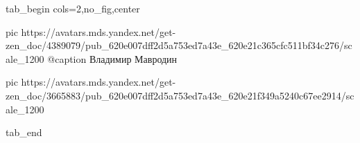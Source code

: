  
 
 
 
 


\ifcmt
  tab_begin cols=2,no_fig,center

     pic https://avatars.mds.yandex.net/get-zen_doc/4389079/pub_620e007dff2d5a753ed7a43e_620e21c365cfc511bf34c276/scale_1200
		 @caption Владимир Мавродин

		 pic https://avatars.mds.yandex.net/get-zen_doc/3665883/pub_620e007dff2d5a753ed7a43e_620e21f349a5240c67ee2914/scale_1200

  tab_end
\fi
